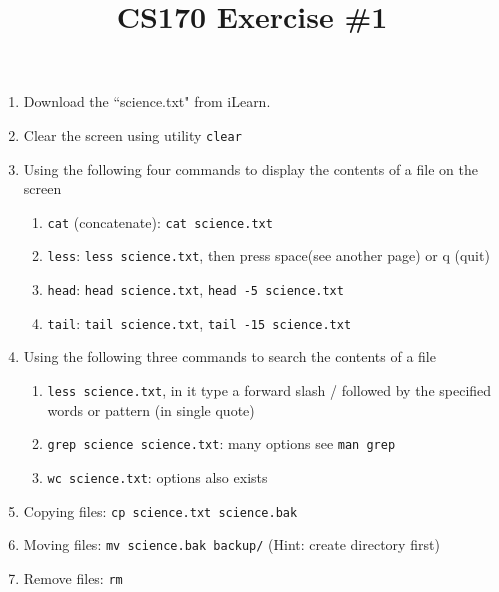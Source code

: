 \documentclass[11pt]{article}
\title{CS170 Exercise \#1}
\author{}
\begin{document}
\maketitle
\begin{enumerate}
\item Download the ``science.txt" from iLearn.

\item Clear the screen using utility \texttt{clear}

\item Using the following four commands to display the contents of a file on the screen
\begin{enumerate}
\item \texttt{cat} (concatenate): \texttt{cat science.txt}
\item \texttt{less}: \texttt{less science.txt}, then press space(see another page) or q (quit)
\item \texttt{head}: \texttt{head science.txt}, \texttt{head -5 science.txt}
\item \texttt{tail}: \texttt{tail science.txt}, \texttt{tail -15 science.txt}
\end{enumerate}

\item Using the following three commands to search the contents of a file
\begin{enumerate}
\item \texttt{less science.txt}, in it type a forward slash / followed by the specified words or pattern (in single quote)
\item \texttt{grep science science.txt}: many options see \texttt{man grep}
\item \texttt{wc science.txt}: options also exists
\end{enumerate}

\item Copying files: \texttt{cp science.txt science.bak}

\item Moving files: \texttt{mv science.bak backup/} (Hint: create directory first)

\item Remove files: \texttt{rm}
\end{enumerate}
\end{document}
